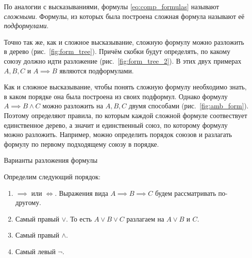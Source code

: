 По аналогии с высказываниями, формулы \eqref{eq:comp_formulas}
называют {\it сложными}.
Формулы, из которых была построена сложная формула
называют её {\it подформулами}.

Точно так же, как и сложное высказывание, сложную формулу можно
разложить в дерево (рис.~\ref{fig:form_tree}). Причём скобки будут
определять, по какому союзу должно идти разложение (рис.~\ref{fig:form_tree_2}).
В этих двух примерах $A,B,C$ и $A\implies B$ являются подформулами.

Как и сложное высказывание, чтобы понять сложную формулу
необходимо знать, в каком порядке она была построена из своих подформул.
Однако формулу $A\implies B\land C$ можно разложить на $A,B,C$ двумя
способами (рис.~\ref{fig:amb_form}).
Поэтому определяют правила, по которым каждой сложной формуле
соотвествует единственное дерево, а значит и единственный союз,
по которому формулу можно разложить.
Например, можно определить порядок союзов и разлагать формулу по первому
подходящему союзу в порядке.

\begin{marginfigure}[-2cm]
  \begin{multicols}{2}

  \end{multicols}

  \caption{Варианты разложения формулы}\label{fig:amb_form}
\end{marginfigure}

Определим следующий порядок:
\begin{enumerate}
  \item{}$\implies$ или $\iff$. Выражения вида ${A\implies B\implies C}$
  будем рассматривать по-другому.
  \item{}Самый правый $\lor$. 
    То есть $A\lor B \lor C$ разлагаем на $A\lor B$ и $C$.
  \item{}Самый правый $\land$.
  \item{}Самый левый $\lnot$.
\end{enumerate}

